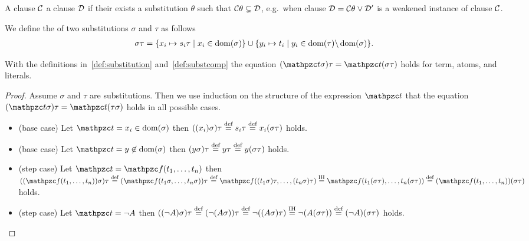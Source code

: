 \begin{definition}\label{def:strictly:subsumes}
	A clause \( \mcC \)  a clause \( \mcD \) if their exists a substitution \( \theta \) such that \( \mcC\theta \subsetneq \mcD \),
	e.g.~when clause \( \mcD = \mcC\theta \lor \mcD' \) is a weakened instance of clause \( \mcC \).
\end{definition}

\begin{definition}\label{def:substcomp}
We define the  of two substitutions \( \sigma \) and \( \tau \) as follows
	\begin{align*}
		\sigma\tau&=\{ x_i\mapsto s_i\tau\mid x_i\in\domain(\sigma) \}
		\cup
		\{ y_i\mapsto t_i\mid y_i\in\domain(\tau) \backslash \domain(\sigma) \}.
	\end{align*}
\end{definition}

\begin{lemma}\label{lem:substitution}
	With the definitions in~\ref{def:substitution} and~\ref{def:substcomp} the equation
	\( (\mct\sigma)\tau = \mct(\sigma\tau) \) holds for
	term, atoms, and literals.
\end{lemma}

\begin{proof}
	Assume \( \sigma \) and \( \tau \) are substitutions.
	Then we use induction on the structure of the 	expression \( \mct \)
	that the equation \( (\mct\sigma)\tau =  \mct(\tau\sigma) \) holds in all possible cases.
	\begin{itemize}
		\item (base case) Let \( \mct = x_i \in\domain(\sigma) \) then
		\( ((x_i)\sigma)\tau\defEQ s_i\tau\defEQ x_i(\sigma\tau) \) holds.

		\item (base case) Let \( \mct = y \not\in\domain(\sigma) \) then
		\( (y\sigma)\tau \defEQ y\tau \defEQ y(\sigma\tau) \) holds.

		\item (step case) Let \( \mct = \mcf(t_1,\ldots,t_n) \)
		then
		\(
			((\mcf(t_1,\ldots,t_n))\sigma)\tau
		\defEQ
		(\mcf(t_1\sigma,\ldots,t_n\sigma))\tau
		\defEQ
		\mcf((t_1\sigma)\tau,\ldots,(t_n\sigma)\tau)
		\defEQ[IH]
		\mcf(t_1(\sigma\tau),\ldots,t_n(\sigma\tau))
		\defEQ
		(\mcf(t_1,\ldots,t_n))(\sigma\tau)
		\) holds.

		\item (step case) Let \( \mct = \lnot A \) then
		\(
		((\lnot A)\sigma)\tau
		\defEQ
		(\lnot(A\sigma))\tau
		\defEQ
		\lnot((A\sigma)\tau)
		\defEQ[IH]
		\lnot(A(\sigma\tau))
		\defEQ
		(\lnot A)(\sigma\tau)
		\) holds.
	\end{itemize}
\end{proof}
